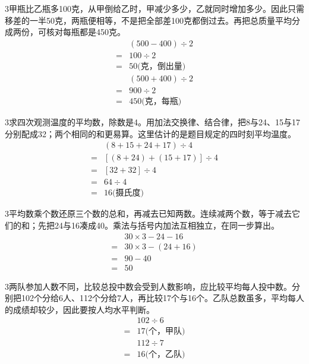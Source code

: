 \documentclass[multi=snippet,border={5bp 20bp 5bp 5bp}]{standalone}
\newenvironment{snippet}[3]{\begin{minipage}{#1bp}\color{answerred}\fontsize{#2}{#3}\selectfont\raggedright}{\end{minipage}}
\begin{document}
\begin{snippet}{505}{11.5}{14}\begin{multicols}{3}\raggedcolumns 甲瓶比乙瓶多100克，从甲倒给乙时，甲减少多少，乙就同时增加多少。因此只需移差的一半50克，两瓶便相等，不是把全部差100克都倒过去。再把总质量平均分成两份，可核对每瓶都是450克。\[\begin{aligned}&(500-400)\div2\\={}&100\div2\\={}&50\text{(克，倒出量)}\end{aligned}\]\[\begin{aligned}&(500+400)\div2\\={}&900\div2\\={}&450\text{(克，每瓶)}\end{aligned}\]\end{multicols}\end{snippet}
\begin{snippet}{505}{11.5}{14}\begin{multicols}{3}\raggedcolumns 求四次观测温度的平均数，除数是4。用加法交换律、结合律，把8与24、15与17分别配成32；两个相同的和更易算。这里估计的是题目规定的四时刻平均温度。\[\begin{aligned}&(8+15+24+17)\div4\\={}&[(8+24)+(15+17)]\div4\\={}&[32+32]\div4\\={}&64\div4\\={}&16\text{(摄氏度)}\end{aligned}\]\end{multicols}\end{snippet}
\begin{snippet}{505}{11.5}{14}\begin{multicols}{3}\raggedcolumns 平均数乘个数还原三个数的总和，再减去已知两数。连续减两个数，等于减去它们的和；先把24与16凑成40。乘法与括号内加法互相独立，在同一步算出。\[\begin{aligned}&30\times3-24-16\\={}&30\times3-(24+16)\\={}&90-40\\={}&50\end{aligned}\]\end{multicols}\end{snippet}
\begin{snippet}{505}{11.5}{14}\begin{multicols}{3}\raggedcolumns 两队参加人数不同，比较总投中数会受到人数影响，应比较平均每人投中数。分别把102个分给6人、112个分给7人，再比较17个与16个。乙队总数虽多，平均每人的成绩却较少，因此要按人均水平判断。\[\begin{aligned}&102\div6\\={}&17\text{(个，甲队)}\\&112\div7\\={}&16\text{(个，乙队)}\end{aligned}\]\end{multicols}\end{snippet}
\end{document}
